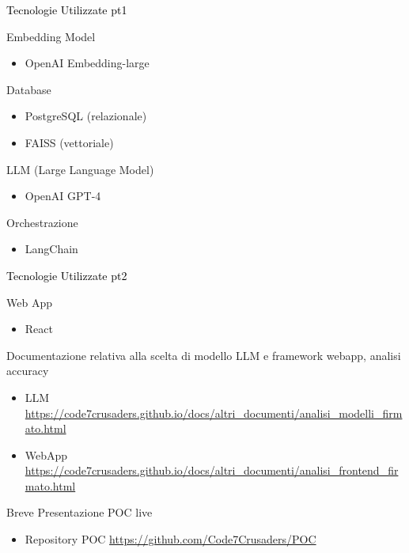 \documentclass{beamer}
\begin{document}
\begin{frame}{\textcolor{black}{Tecnologie Utilizzate pt1}}


    \begin{block}{Embedding Model}
        \begin{itemize}
            \item OpenAI Embedding-large
        \end{itemize}
    \end{block}

    \begin{block}{Database}
        \begin{itemize}
            \item PostgreSQL (relazionale)
            \item FAISS (vettoriale)
        \end{itemize}
    \end{block}

    \begin{block}{LLM (Large Language Model)}
        \begin{itemize}
            \item OpenAI GPT-4
        \end{itemize}
    \end{block}

    \begin{block}{Orchestrazione}
        \begin{itemize}
            \item LangChain
        \end{itemize}
    \end{block}

\end{frame}
\begin{frame}{\textcolor{black}{Tecnologie Utilizzate pt2}}

    \begin{block}{Web App}
        \begin{itemize}
            \item React
        \end{itemize}
    \end{block}



    \begin{block}{Documentazione relativa alla scelta di modello LLM e framework webapp, analisi accuracy}
        \begin{itemize}
            \item LLM \url{https://code7crusaders.github.io/docs/altri_documenti/analisi_modelli_firmato.html}
            \item WebApp \url{https://code7crusaders.github.io/docs/altri_documenti/analisi_frontend_firmato.html}
        \end{itemize}
    \end{block}

\end{frame}

\begin{frame}
    \begin{block}{Breve Presentazione POC live }
        \begin{itemize}
            \item Repository POC \url{https://github.com/Code7Crusaders/POC} 
        \end{itemize}
    \end{block}
\end{frame}
\end{document}
